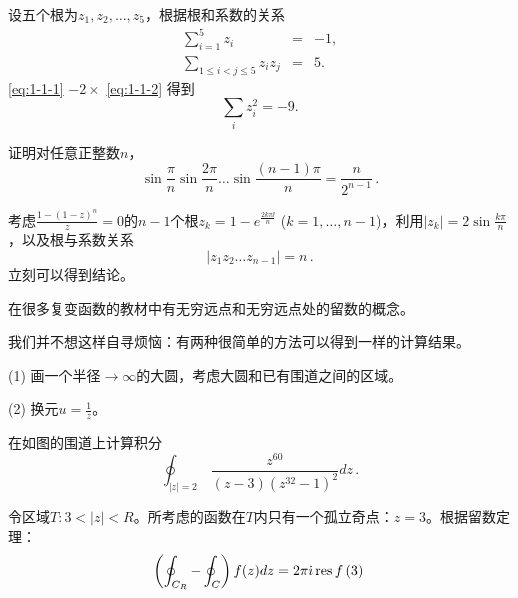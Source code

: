 \documentclass[CJK]{beamer}
\begin{document}
\begin{frame}
\bch
设五个根为$z_1, z_2, \ldots, z_5$，根据根和系数的关系
\begin{eqnarray}
\sum_{i=1}^5 z_i &=& -1,  \label{eq:1-1-1} \\
\sum_{1\le i<j\le 5} z_iz_j &=& 5. \label{eq:1-1-2}
\end{eqnarray}
\eqref{eq:1-1-1} $- 2\times $ \eqref{eq:1-1-2} 得到
$$\sum_i z_i^2 = -9. $$
\ech
\end{frame}

\begin{frame}
\chtitle{\proid (\sthree)}
\bch
证明对任意正整数$n$，
$$\sin\frac{\pi}{n} \sin\frac{2\pi}{n}\ldots \sin\frac{(n-1)\pi}{n} = \frac{n}{2^{n-1}} \, . $$
\ech
\end{frame}

\begin{frame}
\bch
考虑$\frac{1-(1-z)^n}{z} = 0$的$n-1$个根$ z_k = 1- e^{\frac{2k \pi \ii}{n}} $ ($k=1,\ldots, n-1$)，利用$|z_k| = 2\sin\frac{k\pi}{n}$，以及根与系数关系
$$|z_1z_2\ldots z_{n-1}| = n\,. $$
立刻可以得到结论。
\ech
\end{frame}



\begin{frame}
\bch
在很多复变函数的教材中有无穷远点和无穷远点处的留数的概念。

\skiplines

我们并不想这样自寻烦恼：有两种很简单的方法可以得到一样的计算结果。
\bitem
\item[(1)]{画一个半径$\rightarrow \infty$的大圆，考虑大圆和已有围道之间的区域。}
\item[(2)]{换元$u=\frac{1}{z}$。}
\eitem
\ech
\end{frame}

\begin{frame}
\chtitle{\proid (\stwo)}
\bch
{}
在如图的围道上计算积分
$$\oint_{|z|=2}\,\frac{z^{60}}{(z-3)\left(z^{32}-1\right)^2} dz\,. $$
\ech
\end{frame}

\begin{frame}
\bch
{}

令区域$T: 3<|z|<R$。所考虑的函数在$T$内只有一个孤立奇点：$z=3$。根据留数定理：
$$\left(\oint_{C_R} - \oint_C\right) f(z) dz = 2\pi{\dot{\imath}}\,\mathrm{res}\,f\left(3\right)\, $$
\ech
\end{frame}
\end{document}
